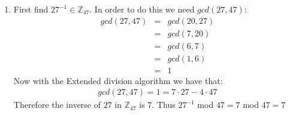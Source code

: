 \begin{enumerate}

\item First find $27^{-1} \in \mathbb{Z}_{47}$. In order to do this we need $gcd(27,47)$:
\begin{eqnarray*}
    gcd(27,47) &=& gcd(20,27) \\
    &=& gcd(7,20) \\
    &=& gcd(6,7) \\
    &=& gcd(1,6) \\
    &=& 1
\end{eqnarray*}
Now with the Extended division algorithm we have that:
\begin{eqnarray*}
    gcd(27,47) = 1 = 7 \cdot 27 - 4 \cdot 47
\end{eqnarray*}
Therefore the inverse of $27$ in $\mathbb{Z}_{47}$ is $7$.
Thus $27^{-1}$ mod $47 = 7$ mod $47 = 7$ 

\end{enumerate}